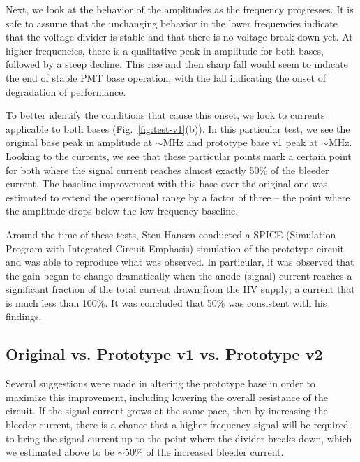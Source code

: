 Next, we look at the behavior of the amplitudes as the frequency progresses. It is safe to assume that the unchanging behavior in the lower frequencies indicate that the voltage divider is stable and that there is no voltage break down yet. At higher frequencies, there is a qualitative peak in amplitude for both bases, followed by a steep decline. This rise and then sharp fall would seem to indicate the end of stable PMT base operation, with the fall indicating the onset of degradation of performance.

To better identify the conditions that cause this onset, we look to currents applicable to both bases (Fig.~\ref{fig:test-v1}(b)). In this particular test, we see the original base peak in amplitude at $\sim$\unit[4]{MHz} and prototype base v1 peak at $\sim$\unit[10]{MHz}. Looking to the currents, we see that these particular points mark a certain point for both where the signal current reaches almost exactly 50\% of the bleeder current. The baseline improvement with this base over the original one was estimated to extend the operational range by a factor of three -- the point where the amplitude drops below the low-frequency baseline.

Around the time of these tests, Sten Hansen conducted a SPICE (Simulation Program with Integrated Circuit Emphasis) simulation of the prototype circuit and was able to reproduce what was observed. In particular, it was observed that the gain began to change dramatically when the anode (signal) current reaches a significant fraction of the total current drawn from the HV supply; a current that is much less than 100\%. It was concluded that 50\% was consistent with his findings.

\subsection{Original vs. Prototype v1 vs. Prototype v2}

Several suggestions were made in altering the prototype base in order to maximize this improvement, including lowering the overall resistance of the circuit. If the signal current grows at the same pace, then by increasing the bleeder current, there is a chance that a higher frequency signal will be required to bring the signal current up to the point where the divider breaks down, which we estimated above to be $\sim 50\%$ of the increased bleeder current.

